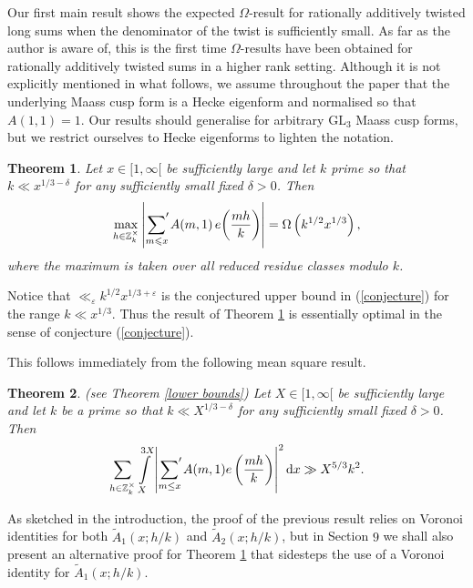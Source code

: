 \documentclass[a4paper,10pt,twoside]{amsart}
\newtheorem{theorem}{Theorem}[section]
\theoremstyle{definition}
\numberwithin{equation}{section}
\renewcommand\:{\colon}
\newcommand{\sump}{\mathop{{\sum}^{\raisebox{-3pt}{\makebox[0pt][l]{$'$}}}}}
\begin{document}
Our first main result shows the expected $\Omega$-result for rationally additively twisted long sums when the denominator of the twist is sufficiently small. As far as the author is aware of, this is the first time $\Omega$-results have been obtained for rationally additively twisted sums in a higher rank setting. Although it is not explicitly mentioned in what follows, we assume throughout the paper that the underlying Maass cusp form is a Hecke eigenform and normalised so that $A(1,1)=1$. Our results should generalise for arbitrary $\mathrm{GL}_3$ Maass cusp forms, but we restrict ourselves to Hecke eigenforms to lighten the notation. 

\begin{theorem}\label{Long-Omega}
Let $x\in[1,\infty[$ be sufficiently large and let $k$ prime so that $k\ll x^{1/3-\delta}$ for any sufficiently small fixed $\delta>0$. Then
\begin{align*}
\max_{h\in\mathbb Z_k^\times}\left|\sump_{m\leqslant x}A(m,1)\,e\!\left(\frac{mh}k\right)\right|=\Omega\left(k^{1/2}x^{1/3}\right),
\end{align*}
where the maximum is taken over all reduced residue classes modulo $k$.
\end{theorem}
\noindent Notice that $\ll_\varepsilon k^{1/2}x^{1/3+\varepsilon}$ is the conjectured upper bound in (\ref{conjecture}) for the range $k\ll x^{1/3}$. Thus the result of Theorem \ref{Long-Omega} is essentially optimal in the sense of conjecture (\ref{conjecture}). 

This follows immediately from the following mean square result.
\begin{theorem}\label{long_mean_square} (see Theorem \ref{lower bounds}) Let $X\in[1,\infty[$ be sufficiently large and let $k$ be a prime so that $k\ll X^{1/3-\delta}$ for any sufficiently small fixed $\delta>0$. Then 
\begin{align*}
\sum_{h\in\mathbb Z_k^\times}\int\limits_X^{3X}\left|\sump_{m\leq x}A(m,1)e\left(\frac{mh}k\right)\right|^2 \mathrm d x\gg X^{5/3}k^2.
\end{align*}
\end{theorem}
\noindent As sketched in the introduction, the proof of the previous result relies on Voronoi identities for both $\widetilde A_1(x;h/k)$ and $\widetilde A_2(x;h/k)$, but in Section $9$ we shall also present an alternative proof for Theorem \ref{Long-Omega} that sidesteps the use of a Voronoi identity for $\widetilde A_1(x;h/k)$. 

\end{document}
